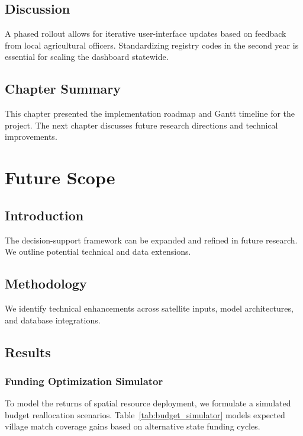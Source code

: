 \documentclass[12pt,a4paper]{report}
\begin{document}
\section{Discussion}
A phased rollout allows for iterative user-interface updates based on feedback from local agricultural officers. Standardizing registry codes in the second year is essential for scaling the dashboard statewide.

\section{Chapter Summary}
This chapter presented the implementation roadmap and Gantt timeline for the project. The next chapter discusses future research directions and technical improvements.

\chapter{Future Scope}
\label{ch:future_scope}

\section{Introduction}
The decision-support framework can be expanded and refined in future research. We outline potential technical and data extensions.

\section{Methodology}
We identify technical enhancements across satellite inputs, model architectures, and database integrations.

\section{Results}
\subsection{Funding Optimization Simulator}
To model the returns of spatial resource deployment, we formulate a simulated budget reallocation scenarios. Table~\ref{tab:budget_simulator} models expected village match coverage gains based on alternative state funding cycles.
\end{document}
